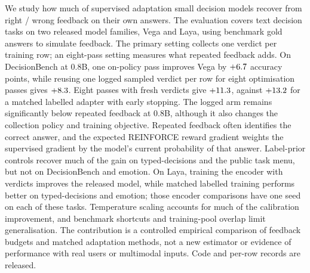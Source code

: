 We study how much of supervised adaptation small decision models recover from right / wrong feedback on their own answers. The evaluation covers text decision tasks on two released model families, Vega and Laya, using benchmark gold answers to simulate feedback. The primary setting collects one verdict per training row; an eight-pass setting measures what repeated feedback adds. On DecisionBench at 0.8B, one on-policy pass improves Vega by $+6.7$ accuracy points, while reusing one logged sampled verdict per row for eight optimisation passes gives $+8.3$. Eight passes with fresh verdicts give $+11.3$, against $+13.2$ for a matched labelled adapter with early stopping. The logged arm remains significantly below repeated feedback at 0.8B, although it also changes the collection policy and training objective. Repeated feedback often identifies the correct answer, and the expected REINFORCE reward gradient weights the supervised gradient by the model's current probability of that answer. Label-prior controls recover much of the gain on typed-decisions and the public task menu, but not on DecisionBench and emotion. On Laya, training the encoder with verdicts improves the released model, while matched labelled training performs better on typed-decisions and emotion; those encoder comparisons have one seed on each of these tasks. Temperature scaling accounts for much of the calibration improvement, and benchmark shortcuts and training-pool overlap limit generalisation. The contribution is a controlled empirical comparison of feedback budgets and matched adaptation methods, not a new estimator or evidence of performance with real users or multimodal inputs. Code and per-row records are released.
